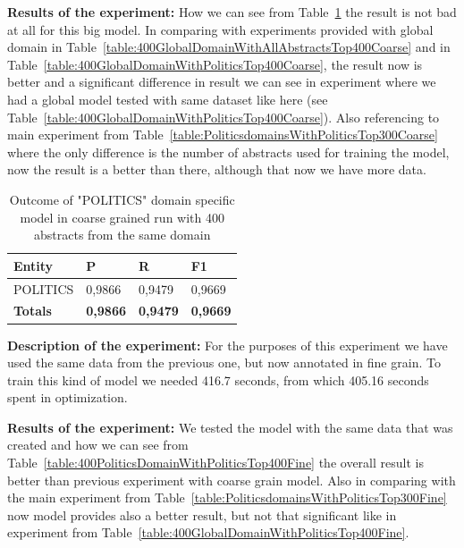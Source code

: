 \documentclass[thesis=M,english]{FITthesis}[2018/05/30]
\begin{document}
\textbf{Results of the experiment:} How we can see from Table~\ref{table:400PoliticsDomainWithPoliticsTop400Coarse} the result is not bad at all for this big model. In comparing with experiments provided with global domain in Table~\ref{table:400GlobalDomainWithAllAbstractsTop400Coarse} and in Table~\ref{table:400GlobalDomainWithPoliticsTop400Coarse}, the result now is better and a significant difference in result we can see in experiment where we had a global model tested with same dataset like here (see Table~\ref{table:400GlobalDomainWithPoliticsTop400Coarse}). Also referencing to main experiment from Table~\ref{table:PoliticsdomainsWithPoliticsTop300Coarse} where the only difference is the number of abstracts used for training the model, now the result is a better than there, although that now we have more data.  

	\begin{table}[H]\centering
		\begin{tabular}{|l|l|l|l|}
			\hline {\textbf{Entity}} & {\textbf{P}} & {\textbf{R}} & {\textbf{F1}}\\\hline
				POLITICS & 0,9866 & 0,9479 & 0,9669\\\hline
				\textbf{Totals} & \textbf{0,9866} & \textbf{0,9479} & \textbf{0,9669}\\\hline
		\end{tabular}
		\caption{Outcome of "POLITICS" domain specific model in coarse grained run with 400 abstracts from the same domain \label{table:400PoliticsDomainWithPoliticsTop400Coarse}}
	\end{table}

\textbf{Description of the experiment:} For the purposes of this experiment we have used the same data from the previous one, but now annotated in fine grain. To train this kind of model we needed 416.7 seconds, from which 405.16 seconds spent in optimization. 

\textbf{Results of the experiment:} We tested the model with the same data that was created and how we can see from Table~\ref{table:400PoliticsDomainWithPoliticsTop400Fine} the overall result is better than previous experiment with coarse grain model. Also in comparing with the main experiment from Table~\ref{table:PoliticsdomainsWithPoliticsTop300Fine} now model provides also a better result, but not that significant like in experiment from Table~\ref{table:400GlobalDomainWithPoliticsTop400Fine}. 
\end{document}
